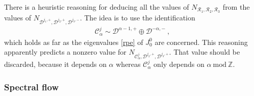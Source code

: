 \documentclass[12pt, a4paper, notitlepage, twoside]{report}
\numberwithin{equation}{section}
\theoremstyle{break}
\begin{document}
There is a heuristic reasoning for deducing all the values of $N_{\mathcal{R}_1,\mathcal{R}_2,\mathcal{R}_3}$ from the values of $N_{\mathcal{D}^{j_1,+},\mathcal{D}^{j_2,+},\mathcal{D}^{j_3,-}}$.
The idea is to use the identification
\begin{align}
 \mathcal{C}^j_\alpha \sim \mathcal{D}^{\alpha-1,+} \oplus \mathcal{D}^{-\alpha,-}\ ,
\label{cjdd}
\end{align}
which holds as far as the eigenvalues \eqref{rpe} of $J^0_0$ are concerned.
This reasoning apparently predicts a nonzero value for $N_{\mathcal{C}^j_\alpha,\mathcal{D}^{j_2,+},\mathcal{D}^{j_3,+}}$.
That value should be discarded, because it depends on $\alpha$ whereas $\mathcal{C}^j_\alpha$ only depends on $\alpha\ \text{mod}\ {\mathbb{Z}}$.

\subsubsection{Spectral flow}
\end{document}
